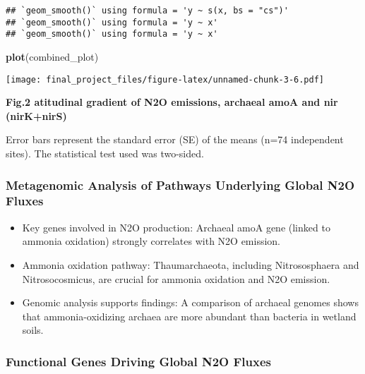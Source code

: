 \documentclass[
]{article}
\newenvironment{Shaded}{\begin{snugshade}}{\end{snugshade}}
\newcommand{\FunctionTok}[1]{\textcolor[rgb]{0.13,0.29,0.53}{\textbf{#1}}}
\newcommand{\NormalTok}[1]{#1}
\providecommand{\tightlist}{%
  \setlength{\itemsep}{0pt}\setlength{\parskip}{0pt}}
\begin{document}
\begin{verbatim}
## `geom_smooth()` using formula = 'y ~ s(x, bs = "cs")'
## `geom_smooth()` using formula = 'y ~ x'
## `geom_smooth()` using formula = 'y ~ x'
\end{verbatim}

\begin{Shaded}
\begin{Highlighting}[]
\FunctionTok{plot}\NormalTok{(combined\_plot)}
\end{Highlighting}
\end{Shaded}

\texttt{[image: final\_project\_files/figure-latex/unnamed-chunk-3-6.pdf]}

\textbf{Fig.2 atitudinal gradient of N2O emissions, archaeal amoA and
nir (nirK+nirS)}

Error bars represent the standard error (SE) of the means (n=74
independent sites). The statistical test used was two-sided.

\hypertarget{metagenomic-analysis-of-pathways-underlying-global-n2o-fluxes}{%
\subsubsection{\texorpdfstring{\textbf{Metagenomic Analysis of Pathways
Underlying Global N2O
Fluxes}}{Metagenomic Analysis of Pathways Underlying Global N2O Fluxes}}\label{metagenomic-analysis-of-pathways-underlying-global-n2o-fluxes}}

\begin{itemize}
\tightlist
\item
  Key genes involved in N2O production: Archaeal amoA gene (linked to
  ammonia oxidation) strongly correlates with N2O emission.
\item
  Ammonia oxidation pathway: Thaumarchaeota, including Nitrososphaera
  and Nitrosocosmicus, are crucial for ammonia oxidation and N2O
  emission.
\item
  Genomic analysis supports findings: A comparison of archaeal genomes
  shows that ammonia-oxidizing archaea are more abundant than bacteria
  in wetland soils.
\end{itemize}

\hypertarget{functional-genes-driving-global-n2o-fluxes}{%
\subsubsection{\texorpdfstring{\textbf{Functional Genes Driving Global
N2O
Fluxes}}{Functional Genes Driving Global N2O Fluxes}}\label{functional-genes-driving-global-n2o-fluxes}}
\end{document}
